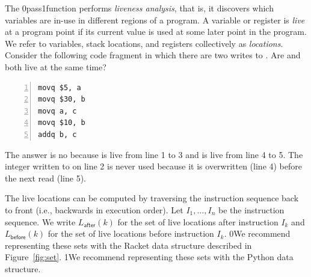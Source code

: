 \documentclass[7x10,nocrop]{TimesAPriori_MIT}%
\def\racketEd{0}
\def\pythonEd{1}
\def\edition{1}
\newcommand{\racket}[1]{{\if\edition\racketEd{#1}\fi}}
\newcommand{\python}[1]{{\if\edition\pythonEd #1\fi}}
\begin{document}
The  \racket{pass}\python{function}
performs \emph{liveness analysis}, that
is, it discovers which variables are in-use in different regions of a
program.
%
A variable or register is \emph{live} at a program point if its
current value is used at some later point in the program.  We refer to
variables, stack locations, and registers collectively as
\emph{locations}.
%
Consider the following code fragment in which there are two writes to
. Are  and  both live at the same time?
\begin{center}
  \begin{minipage}{0.96\textwidth}
\begin{lstlisting}[numbers=left,numberstyle=\tiny]
movq $5, a
movq $30, b
movq a, c
movq $10, b
addq b, c
\end{lstlisting}
\end{minipage}
\end{center}
The answer is no because  is live from line 1 to 3 and
 is live from line 4 to 5.  The integer written to  on
line 2 is never used because it is overwritten (line 4) before the
next read (line 5).

The live locations can be computed by traversing the instruction
sequence back to front (i.e., backwards in execution order).  Let
$I_1,\ldots, I_n$ be the instruction sequence. We write
$L_{\mathsf{after}}(k)$ for the set of live locations after
instruction $I_k$ and $L_{\mathsf{before}}(k)$ for the set of live
locations before instruction $I_k$.
\racket{We recommend representing these
sets with the Racket  data structure described in
Figure~\ref{fig:set}.}
\python{We recommend representing these sets with the Python
  \href{https://docs.python.org/3.10/library/stdtypes.html\#set-types-set-frozenset}{\code{set}}
data structure.}
\end{document}
